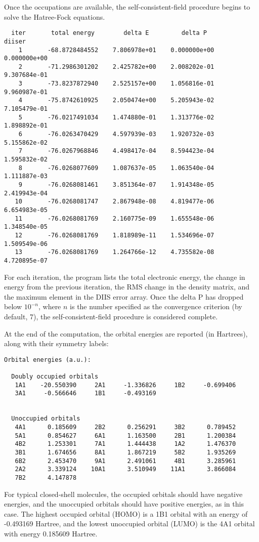 Once the occupations are available, the self-consistent-field procedure
begins to solve the Hatree-Fock equations.  
\begin{verbatim}
  iter       total energy        delta E         delta P          diiser
    1       -68.8728484552    7.806978e+01    0.000000e+00    0.000000e+00
    2       -71.2986301202    2.425782e+00    2.008202e-01    9.307684e-01
    3       -73.8237872940    2.525157e+00    1.056816e-01    9.960987e-01
    4       -75.8742610925    2.050474e+00    5.205943e-02    7.105479e-01
    5       -76.0217491034    1.474880e-01    1.313776e-02    1.898892e-01
    6       -76.0263470429    4.597939e-03    1.920732e-03    5.155862e-02
    7       -76.0267968846    4.498417e-04    8.594423e-04    1.595832e-02
    8       -76.0268077609    1.087637e-05    1.063540e-04    1.111887e-03
    9       -76.0268081461    3.851364e-07    1.914348e-05    2.419943e-04
   10       -76.0268081747    2.867948e-08    4.819477e-06    6.654983e-05
   11       -76.0268081769    2.160775e-09    1.655548e-06    1.348540e-05
   12       -76.0268081769    1.818989e-11    1.534696e-07    1.509549e-06
   13       -76.0268081769    1.264766e-12    4.735582e-08    4.720895e-07
\end{verbatim}
For each iteration, the program lists the total electronic energy, the
change in energy from the previous iteration, the RMS change in the
density matrix, and the maximum element in the DIIS error array.  Once
the delta P has dropped below $10^{-n}$, where $n$ is the number specified
as the convergence criterion (by default, 7), the self-consistent-field
procedure is considered complete.  

At the end of the computation, the orbital energies are reported (in 
Hartrees), along with their symmetry labels:
\begin{verbatim}
Orbital energies (a.u.):
                                                                                
  Doubly occupied orbitals
   1A1    -20.550390     2A1     -1.336826     1B2     -0.699406
   3A1     -0.566646     1B1     -0.493169
                                                                                
                                                                                
  Unoccupied orbitals
   4A1      0.185609     2B2      0.256291     3B2      0.789452
   5A1      0.854627     6A1      1.163500     2B1      1.200384
   4B2      1.253301     7A1      1.444438     1A2      1.476370
   3B1      1.674656     8A1      1.867219     5B2      1.935269
   6B2      2.453470     9A1      2.491061     4B1      3.285961
   2A2      3.339124    10A1      3.510949    11A1      3.866084
   7B2      4.147878

\end{verbatim}
For typical closed-shell molecules, the occupied orbitals should have
negative energies, and the unoccupied orbitals should have positive
energies, as in this case.  The highest occupied orbital (HOMO) is
a 1B1 orbital with an energy of -0.493169 Hartree, and the lowest
unoccupied orbital (LUMO) is the 4A1 orbital with energy 0.185609 Hartree.

